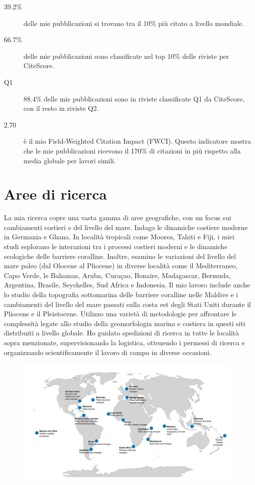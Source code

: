 \documentclass[11pt]{article}
\begin{document}
{\footnotesize 
\begin{description}
  \item [39.2\%] delle mie pubblicazioni si trovano tra il 10\% più citato a livello mondiale.
  \item [66.7\%] delle mie pubblicazioni sono classificate nel top 10\% delle riviste per CiteScore.
  \item [Q1] 88.4\% delle mie pubblicazioni sono in riviste classificate Q1 da CiteScore, con il resto in riviste Q2.
  \item [2.70] è il mio Field-Weighted Citation Impact (FWCI). Questo indicatore mostra che le mie pubblicazioni ricevono il 170\% di citazioni in più rispetto alla media globale per lavori simili.
\end{description}}

\section{Aree di ricerca}
{\normalfont La mia ricerca copre una vasta gamma di aree geografiche, con un focus sui cambiamenti costieri e del livello del mare. Indago le dinamiche costiere moderne in Germania e Ghana. In località tropicali come Moorea, Tahiti e Fiji, i miei studi esplorano le interazioni tra i processi costieri moderni e le dinamiche ecologiche delle barriere coralline. Inoltre, esamino le variazioni del livello del mare paleo (dal Olocene al Pliocene) in diverse località come il Mediterraneo, Capo Verde, le Bahamas, Aruba, Curaçao, Bonaire, Madagascar, Bermuda, Argentina, Brasile, Seychelles, Sud Africa e Indonesia. Il mio lavoro include anche lo studio della topografia sottomarina delle barriere coralline nelle Maldive e i cambiamenti del livello del mare passati sulla costa est degli Stati Uniti durante il Pliocene e il Pleistocene. Utilizzo una varietà di metodologie per affrontare le complessità legate allo studio della geomorfologia marina e costiera in questi siti distribuiti a livello globale. Ho guidato spedizioni di ricerca in tutte le località sopra menzionate, supervisionando la logistica, ottenendo i permessi di ricerca e organizzando scientificamente il lavoro di campo in diverse occasioni.}

\begin{figure}[h]
\centering
\includegraphics[width=\textwidth]{Research_map/field_data.pdf}
\end{figure}
\end{document}
